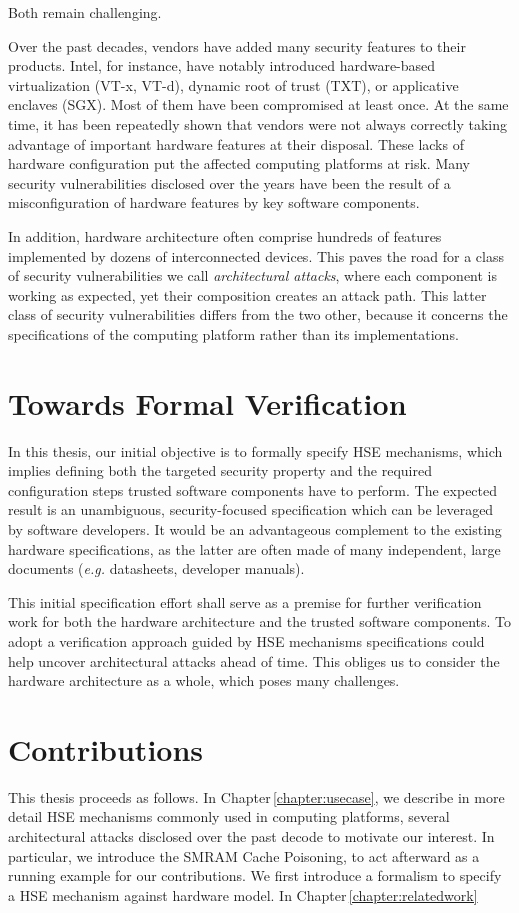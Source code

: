 Both remain challenging.

Over the past decades, vendors have added many security features to their
products.
%
Intel, for instance, have notably introduced hardware-based virtualization
(VT-x, VT-d), dynamic root of trust (TXT), or applicative enclaves (SGX).
%
Most of them have been compromised at least once.
%
At the same time, it has been repeatedly shown that vendors were not always
correctly taking advantage of important hardware features at their disposal.
%
These lacks of hardware configuration put the affected computing platforms at
risk.
%
Many security vulnerabilities disclosed over the years have been the result of a
misconfiguration of hardware features by key software components.

In addition, hardware architecture often comprise hundreds of features
implemented by dozens of interconnected devices.
%
This paves the road for a class of security vulnerabilities we call
\emph{architectural attacks}, where each component is working as expected, yet
their composition creates an attack path.
%
This latter class of security vulnerabilities differs from the two other,
because it concerns the specifications of the computing platform rather than its
implementations.

\section{Towards Formal Verification}

In this thesis, our initial objective is to formally specify HSE mechanisms,
which implies defining both the targeted security property and the required
configuration steps trusted software components have to perform.
%
The expected result is an unambiguous, security-focused specification which can
be leveraged by software developers.
%
It would be an advantageous complement to the existing hardware specifications,
as the latter are often made of many independent, large documents (\emph{e.g.}
datasheets, developer manuals).

This initial specification effort shall serve as a premise for further
verification work for both the hardware architecture and the trusted software
components.
%
To adopt a verification approach guided by HSE mechanisms specifications could
help uncover architectural attacks ahead of time.
%
This obliges us to consider the hardware architecture as a whole, which poses
many challenges.

\section{Contributions}

This thesis proceeds as follows. In Chapter\,\ref{chapter:usecase}, we describe
in more detail HSE mechanisms commonly used in computing platforms, several
architectural attacks disclosed over the past decode to motivate our interest.
%
In particular, we introduce the SMRAM Cache Poisoning, to act afterward as a
running example for our contributions.
%
We first introduce a formalism to specify a HSE mechanism against hardware
model.
%
In Chapter\,\ref{chapter:relatedwork}
